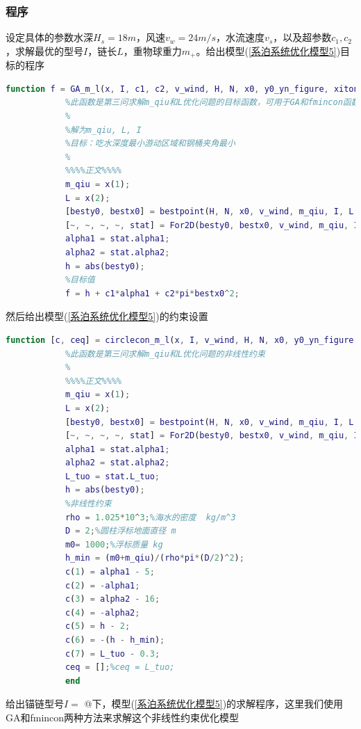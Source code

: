 \documentclass[UTF8]{ctexbook}
\makeatletter
\theoremstyle{nonumberplain}
\newcommand*{\rom}[1]{\expandafter\@slowromancap\romannumeral #1@}
\makeatother
\begin{document}
        \subsubsection{程序}
            \par
            设定具体的参数水深$H_s=18m$，风速$v_w=24m/s$，水流速度$v_s$，以及超参数$c_1,c_2$，求解最优的型号$I$，链长$L$，重物球重力$m_+$。给出模型(\ref{系泊系统优化模型5})目标的程序
            \begin{lstlisting}[language = Matlab]
            function f = GA_m_l(x, I, c1, c2, v_wind, H, N, x0, y0_yn_figure, xitong_figure)
            %此函数是第三问求解m_qiu和L优化问题的目标函数，可用于GA和fmincon函数。
            %
            %解为m_qiu, L, I
            %目标：吃水深度最小游动区域和钢桶夹角最小
            %
            %%%%正文%%%%
            m_qiu = x(1);
            L = x(2);
            [besty0, bestx0] = bestpoint(H, N, x0, v_wind, m_qiu, I, L, y0_yn_figure);
            [~, ~, ~, ~, stat] = For2D(besty0, bestx0, v_wind, m_qiu, I, L, xitong_figure);
            alpha1 = stat.alpha1;
            alpha2 = stat.alpha2;
            h = abs(besty0);
            %目标值
            f = h + c1*alpha1 + c2*pi*bestx0^2;
            \end{lstlisting}
            然后给出模型(\ref{系泊系统优化模型5})的约束设置
            \begin{lstlisting}[language = Matlab]
            function [c, ceq] = circlecon_m_l(x, I, v_wind, H, N, x0, y0_yn_figure, xitong_figure)
            %此函数是第三问求解m_qiu和L优化问题的非线性约束
            %
            %%%%正文%%%%
            m_qiu = x(1);
            L = x(2);
            [besty0, bestx0] = bestpoint(H, N, x0, v_wind, m_qiu, I, L, y0_yn_figure);
            [~, ~, ~, ~, stat] = For2D(besty0, bestx0, v_wind, m_qiu, I, L, xitong_figure);
            alpha1 = stat.alpha1;
            alpha2 = stat.alpha2;
            L_tuo = stat.L_tuo;
            h = abs(besty0);
            %非线性约束
            rho = 1.025*10^3;%海水的密度  kg/m^3
            D = 2;%圆柱浮标地面直径 m
            m0= 1000;%浮标质量 kg
            h_min = (m0+m_qiu)/(rho*pi*(D/2)^2);
            c(1) = alpha1 - 5;
            c(2) = -alpha1;
            c(3) = alpha2 - 16;
            c(4) = -alpha2;
            c(5) = h - 2;
            c(6) = -(h - h_min);
            c(7) = L_tuo - 0.3;
            ceq = [];%ceq = L_tuo;
            end
            \end{lstlisting}
            给出锚链型号$I =$ \rom{2}下，模型(\ref{系泊系统优化模型5})的求解程序，这里我们使用GA和fmincon两种方法来求解这个非线性约束优化模型
\end{document}
